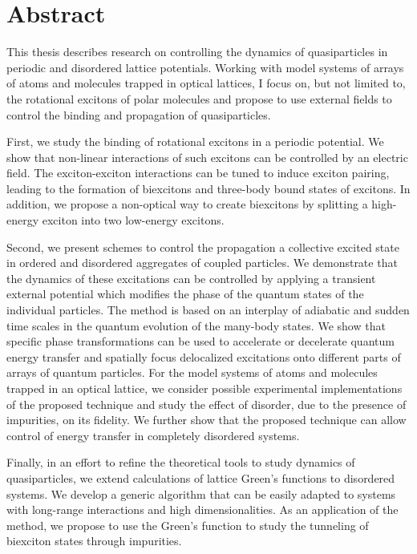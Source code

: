 
\chapter{Abstract}

This thesis describes research on controlling the dynamics of quasiparticles in 
 periodic and disordered lattice potentials. Working with model systems of arrays of atoms and molecules trapped in  optical lattices, 
I focus on, but not limited to, the rotational excitons of polar molecules and propose to use external fields to 
control the binding and propagation of quasiparticles. 

First, we study the binding of  rotational excitons in a periodic potential. We show that non-linear interactions of such excitons can
 be controlled by an electric field. The exciton-exciton interactions can be tuned
 to induce exciton pairing, leading to the formation of biexcitons and three-body bound states of excitons. In addition, we propose a non-optical way to create biexcitons by splitting a high-energy exciton into two 
low-energy excitons. 

Second, we present schemes to control the propagation a collective
 excited state in ordered and disordered aggregates of coupled particles. We demonstrate that the dynamics of these excitations can be controlled by
 applying a transient external potential which modifies the phase of the quantum
 states of the individual particles. The method is based on an interplay of adiabatic
 and sudden time scales in the quantum evolution of the many-body states. We show
 that specific phase transformations can be used to accelerate or decelerate quantum
 energy transfer and spatially focus delocalized excitations onto different parts of
arrays of quantum particles. For the model systems of atoms and molecules trapped in an optical lattice, we consider possible experimental implementations
 of the proposed technique and study the effect of disorder, due to the presence of
 impurities, on its fidelity. We further show that the proposed technique can allow
 control of energy transfer in completely disordered systems.
 

Finally, in an effort to refine the theoretical tools to study dynamics of quasiparticles, we extend calculations of lattice 
Green's functions to disordered systems. We develop a generic algorithm that can 
be easily adapted to systems with long-range interactions and high dimensionalities. As an application of the method, we propose 
to use the Green's function to study the tunneling of biexciton states through
 impurities.


